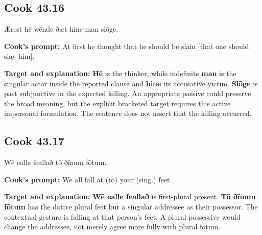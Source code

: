 \par\begin{minipage}{\linewidth}\raggedright
\subsection*{Cook 43.16}

Ǣrest hē wēnde ðæt hine man slōge.

\textbf{Cook's prompt:} At first he thought that he should be slain [that one should slay him].

\textbf{Target and explanation:} \textbf{Hē} is the thinker, while indefinite \textbf{man} is the singular actor inside the reported clause and \textbf{hine} its accusative victim. \textbf{Slōge} is past subjunctive in the expected killing. An appropriate passive could preserve the broad meaning, but the explicit bracketed target requires this active impersonal formulation. The sentence does not assert that the killing occurred.

\end{minipage}\par\addvspace{4pt}

\par\begin{minipage}{\linewidth}\raggedright
\subsection*{Cook 43.17}

Wē ealle feallað tō ðīnum fōtum.

\textbf{Cook's prompt:} We all fall at (tō) your (sing.) feet.

\textbf{Target and explanation:} \textbf{Wē ealle feallað} is first-plural present. \textbf{Tō ðīnum fōtum} has the dative plural feet but a singular addressee as their possessor. The contextual gesture is falling at that person's feet. A plural possessive would change the addressee, not merely agree more fully with plural fōtum.

\end{minipage}\par\addvspace{4pt}

